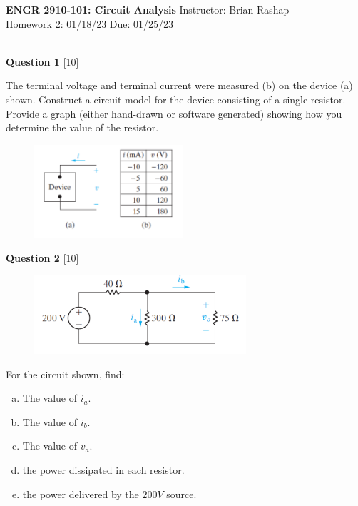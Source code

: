 \documentclass[12pt]{article}
\begin{document}
\begin{center}
\hfil
{\large\bf {ENGR 2910-101: Circuit Analysis}}
\hfill Instructor: Brian Rashap\\
Homework 2: 01/18/23 \hfill Due: 01/25/23\\
\hrulefill\\
\end{center}

{\bf Question 1} [10] %

The terminal voltage and terminal current were measured (b) on the device (a) shown. Construct a circuit model for the device consisting of a single resistor. Provide a graph (either hand-drawn or software generated) showing how you determine the value of the resistor. 

\begin{figure}[h!]
\centering 
\includegraphics[clip,width=0.49\textwidth]{P2-14.png}
\end{figure}

{\bf Question 2} [10] %

\begin{figure}[h!]
  \centering 
 \vspace{-0.1in}
 \includegraphics[clip,width=0.7\textwidth]{Fig2-18.png}
\vspace{-0.1in}
\end{figure}

For the circuit shown, find: 
\begin{enumerate}[(a)]
\item The value of $i_a$.
\item The value of $i_b$.
\item The value of $v_a$.
\item the power dissipated in each resistor.
\item the power delivered by the $200V$ source.
\end{enumerate}
\end{document}
